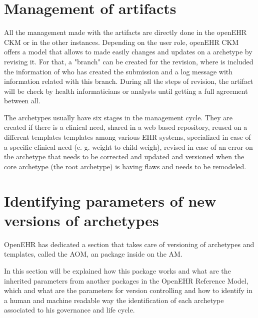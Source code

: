 \documentclass[mim_thesis.tex]{subfiles}
\begin{document}
\section{Management of artifacts}

All the management made with the artifacts are directly done in the openEHR CKM or in the other instances. Depending on the user role, openEHR CKM offers a model that allows to made easily changes and updates on a archetype by revising it. For that, a "branch" can be created for the revision, where is included the information of who has created the submission and a log message with information related with this branch. During all the steps of revision, the artifact will be check by health informaticians or analysts until getting a full agreement between all. 

The archetypes usually have six stages in the management cycle. They are created if there is a clinical need, shared in a web based repository, reused on a different templates templates among various EHR systems, specialized in case of a specific clinical need (e. g. weight to child-weigh), revised in case of an error on the archetype that needs to be corrected and updated and versioned when the core archetype (the root archetype) is having flaws and needs to be remodeled. \citep{article2006leslie}


\section{Identifying parameters of new versions of archetypes}

OpenEHR has dedicated a section that takes care of versioning of archetypes and templates, called the \ac{AOM}, an package inside on the \ac{AM}. \par
In this section will be explained how this package works and what are the inherited parameters from another packages in the OpenEHR Reference Model, which and what are the parameters for version controlling and how to identify in a human and machine readable way the identification of each archetype associated to his governance and life cycle. 
\end{document}
